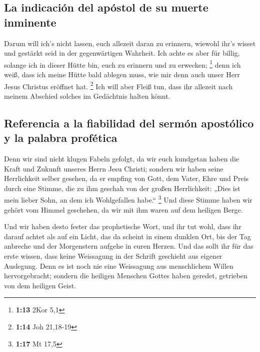 \hypertarget{la-indicaciuxf3n-del-apuxf3stol-de-su-muerte-inminente}{%
\subsection{La indicación del apóstol de su muerte
inminente}\label{la-indicaciuxf3n-del-apuxf3stol-de-su-muerte-inminente}}

 Darum will ich's nicht lassen, euch allezeit daran zu
erinnern, wiewohl ihr's wisset und gestärkt seid in der gegenwärtigen
Wahrheit.  Ich achte es aber für billig, solange ich in
dieser Hütte bin, euch zu erinnern und zu erwecken; \footnote{\textbf{1:13}
  2Kor 5,1}  denn ich weiß, dass ich meine Hütte bald
ablegen muss, wie mir denn auch unser Herr Jesus Christus eröffnet hat.
\footnote{\textbf{1:14} Joh 21,18-19}  Ich will aber
Fleiß tun, dass ihr allezeit nach meinem Abschied solches im Gedächtnis
halten könnt.

\hypertarget{referencia-a-la-fiabilidad-del-sermuxf3n-apostuxf3lico-y-la-palabra-profuxe9tica}{%
\subsection{Referencia a la fiabilidad del sermón apostólico y la
palabra
profética}\label{referencia-a-la-fiabilidad-del-sermuxf3n-apostuxf3lico-y-la-palabra-profuxe9tica}}

 Denn wir sind nicht klugen Fabeln gefolgt, da wir euch
kundgetan haben die Kraft und Zukunft unseres Herrn Jesu Christi;
sondern wir haben seine Herrlichkeit selber gesehen,  da
er empfing von Gott, dem Vater, Ehre und Preis durch eine Stimme, die zu
ihm geschah von der großen Herrlichkeit: „Dies ist mein lieber Sohn, an
dem ich Wohlgefallen habe.`` \footnote{\textbf{1:17} Mt 17,5}
 Und diese Stimme haben wir gehört vom Himmel geschehen,
da wir mit ihm waren auf dem heiligen Berge.

 Und wir haben desto fester das prophetische Wort, und
ihr tut wohl, dass ihr darauf achtet als auf ein Licht, das da scheint
in einem dunklen Ort, bis der Tag anbreche und der Morgenstern aufgehe
in euren Herzen.  Und das sollt ihr für das erste wissen,
dass keine Weissagung in der Schrift geschieht aus eigener Auslegung.
 Denn es ist noch nie eine Weissagung aus menschlichem
Willen hervorgebracht; sondern die heiligen Menschen Gottes haben
geredet, getrieben von dem heiligen Geist.

